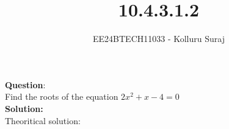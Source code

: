 \documentclass[journal]{IEEEtran}
\begin{document}

\vspace{3cm}

\title{10.4.3.1.2}
\author{EE24BTECH11033 - Kolluru Suraj}
 \maketitle
{\let\newpage\relax\maketitle}

\renewcommand{\thefigure}{\theenumi}
\renewcommand{\thetable}{\theenumi}
\setlength{\intextsep}{10pt} %


\renewcommand{\thetable}{\theenumi}


\textbf{Question}:\\
Find the roots of the equation $2x^2+x-4=0$
\\
\textbf{Solution: }\\
Theoritical solution:\\
\end{document}
